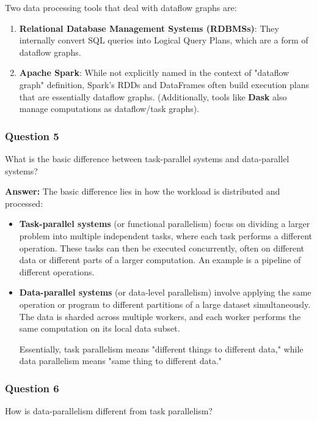 \documentclass{article}
\begin{document}
Two data processing tools that deal with dataflow graphs are:
\begin{enumerate}
    \item \textbf{Relational Database Management Systems (RDBMSs)}: They internally convert SQL queries into Logical Query Plans, which are a form of dataflow graphs.
    \item \textbf{Apache Spark}: While not explicitly named in the context of "dataflow graph" definition, Spark's RDDs and DataFrames often build execution plans that are essentially dataflow graphs. (Additionally, tools like \textbf{Dask} also manage computations as dataflow/task graphs).
\end{enumerate}

\subsubsection*{Question 5}
What is the basic difference between task-parallel systems and data-parallel systems? 

\textbf{Answer:}
The basic difference lies in how the workload is distributed and processed:
\begin{itemize}
    \item \textbf{Task-parallel systems} (or functional parallelism) focus on dividing a larger problem into multiple independent tasks, where each task performs a different operation. These tasks can then be executed concurrently, often on different data or different parts of a larger computation. An example is a pipeline of different operations.
    \item \textbf{Data-parallel systems} (or data-level parallelism) involve applying the same operation or program to different partitions of a large dataset simultaneously. The data is sharded across multiple workers, and each worker performs the same computation on its local data subset.

Essentially, task parallelism means "different things to different data," while data parallelism means "same thing to different data."
\end{itemize}

\subsubsection*{Question 6}
How is data-parallelism different from task parallelism? 
\end{document}
